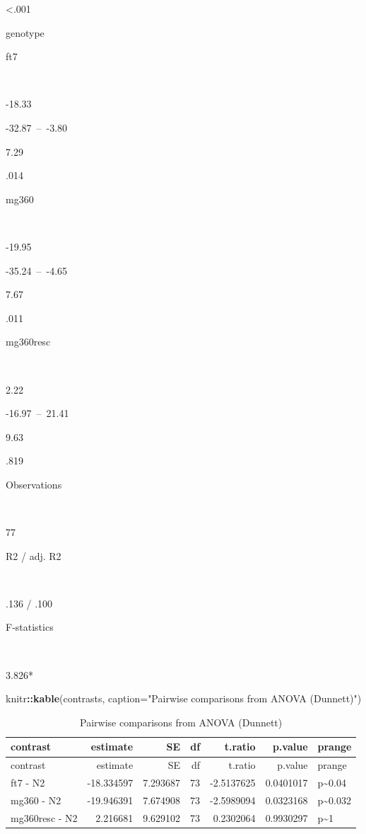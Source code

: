 \documentclass[]{article}
\newenvironment{Shaded}{\begin{snugshade}}{\end{snugshade}}
\newcommand{\KeywordTok}[1]{\textcolor[rgb]{0.13,0.29,0.53}{\textbf{#1}}}
\newcommand{\DataTypeTok}[1]{\textcolor[rgb]{0.13,0.29,0.53}{#1}}
\newcommand{\StringTok}[1]{\textcolor[rgb]{0.31,0.60,0.02}{#1}}
\newcommand{\OperatorTok}[1]{\textcolor[rgb]{0.81,0.36,0.00}{\textbf{#1}}}
\newcommand{\NormalTok}[1]{#1}
\begin{document}
\textless{}.001

genotype

ft7

~

-18.33

-32.87~--~-3.80

7.29

.014

mg360

~

-19.95

-35.24~--~-4.65

7.67

.011

mg360resc

~

2.22

-16.97~--~21.41

9.63

.819

Observations

~

77

R2 / adj. R2

~

.136 / .100

F-statistics

~

3.826*

\begin{Shaded}
\begin{Highlighting}[]
\NormalTok{knitr}\OperatorTok{::}\KeywordTok{kable}\NormalTok{(contrasts, }\DataTypeTok{caption=}\StringTok{"Pairwise comparisons from ANOVA (Dunnett)"}\NormalTok{)}
\end{Highlighting}
\end{Shaded}

\begin{longtable}[]{@{}lrrrrrl@{}}
\caption{Pairwise comparisons from ANOVA (Dunnett)}\tabularnewline
\toprule
contrast & estimate & SE & df & t.ratio & p.value &
prange\tabularnewline
\midrule
\endfirsthead
\toprule
contrast & estimate & SE & df & t.ratio & p.value &
prange\tabularnewline
\midrule
\endhead
ft7 - N2 & -18.334597 & 7.293687 & 73 & -2.5137625 & 0.0401017 &
p\textasciitilde{}0.04\tabularnewline
mg360 - N2 & -19.946391 & 7.674908 & 73 & -2.5989094 & 0.0323168 &
p\textasciitilde{}0.032\tabularnewline
mg360resc - N2 & 2.216681 & 9.629102 & 73 & 0.2302064 & 0.9930297 &
p\textasciitilde{}1\tabularnewline
\bottomrule
\end{longtable}
\end{document}
